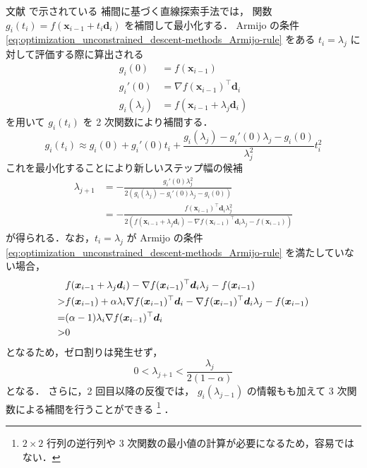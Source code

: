 文献 \cite[Section 9.7.1]{Press2007} で示されている
補間に基づく直線探索手法では，
関数 $g_i(t_i) = f(\bm{x}_{i-1} + t_i \bm{d}_i)$ を補間して最小化する．
Armijo の条件
\eqref{eq:optimization_unconstrained_descent-methods_Armijo-rule}
をある $t_i = \lambda_j$ に対して評価する際に算出される
\begin{align}
    g_i(0)         & = f(\bm{x}_{i-1})                      \\
    g_i'(0)        & = \nabla f(\bm{x}_{i-1})^\top \bm{d}_i \\
    g_i(\lambda_j) & = f(\bm{x}_{i-1} + \lambda_j \bm{d}_i)
\end{align}
を用いて $g_i(t_i)$ を 2 次関数により補間する．
\begin{equation}
    g_i(t_i) \approx
    g_i(0) + g_i'(0) t_i
    + \frac{g_i(\lambda_j) - g_i'(0) \lambda_j - g_i(0)}{\lambda_j^2} t_i^2
\end{equation}
これを最小化することにより新しいステップ幅の候補
\begin{align}
    \lambda_{j+1} & = - \frac{g_i'(0) \lambda_j^2}                       %
    {2 \left( g_i(\lambda_j) - g_i'(0) \lambda_j - g_i(0) \right)}
    \\
                  & = - \frac{f(\bm{x}_{i-1})^\top \bm{d}_i \lambda_j^2} %
    {2 \left( f(\bm{x}_{i-1} + \lambda_j \bm{d}_i) %
        - \nabla f(\bm{x}_{i-1})^\top \bm{d}_i \lambda_j %
        - f(\bm{x}_{i-1}) \right)}
    \label{eq:eq:optimization_unconstrained_descent-methods_interpolating-line-search-update}
\end{align}
が得られる．なお，$t_i = \lambda_j$ が
Armijo の条件
\eqref{eq:optimization_unconstrained_descent-methods_Armijo-rule}
を満たしていない場合，
\begin{align}
      & f(\bm{x}_{i-1} + \lambda_j \bm{d}_i)
    - \nabla f(\bm{x}_{i-1})^\top \bm{d}_i \lambda_j
    - f(\bm{x}_{i-1})
    \notag                                                                      \\
    > & f(\bm{x}_{i-1}) + \alpha \lambda_i \nabla f(\bm{x}_{i-1})^\top \bm{d}_i
    - \nabla f(\bm{x}_{i-1})^\top \bm{d}_i \lambda_j
    - f(\bm{x}_{i-1})
    \notag                                                                      \\
    = & (\alpha - 1) \lambda_i \nabla f(\bm{x}_{i-1})^\top \bm{d}_i
    \\
    > & 0
\end{align}
となるため，ゼロ割りは発生せず，
\begin{equation}
    0 < \lambda_{j+1} < \frac{\lambda_j}{2(1-\alpha)}
\end{equation}
となる．
さらに，2 回目以降の反復では，
$g_i(\lambda_{j-1})$ の情報もも加えて 3 次関数による補間を行うことができる
\cite[Section 9.7.1]{Press2007}
\footnote{$2 \times 2$ 行列の逆行列や 3 次関数の最小値の計算が必要になるため，容易ではない．}
．

